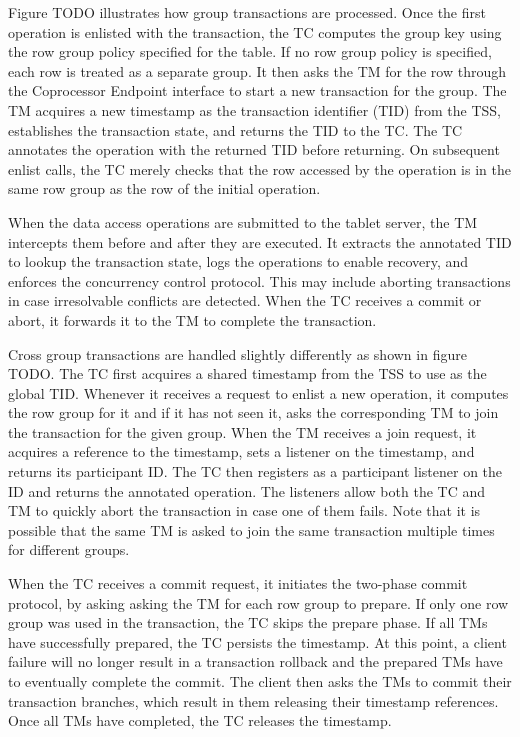 \documentclass[10pt,final,journal]{IEEEtran}
\begin{document}
Figure TODO illustrates how group transactions are processed. Once the first operation is enlisted with the transaction, the TC computes the group key using the row group policy specified for the table. If no row group policy is specified, each row is treated as a separate group. It then asks the TM for the row through the Coprocessor Endpoint interface to start a new transaction for the group. The TM acquires a new timestamp as the transaction identifier (TID) from the TSS, establishes the transaction state, and returns the TID to the TC. The TC annotates the operation with the returned TID before returning. On subsequent enlist calls, the TC merely checks that the row accessed by the operation is in the same row group as the row of the initial operation.

When the data access operations are submitted to the tablet server, the TM intercepts them before and after they are executed. It extracts the annotated TID to lookup the transaction state, logs the operations to enable recovery, and enforces the concurrency control protocol. This may include aborting transactions in case irresolvable conflicts are detected. When the TC receives a commit or abort, it forwards it to the TM to complete the transaction.


Cross group transactions are handled slightly differently as shown in figure TODO. The TC first acquires a shared timestamp from the TSS to use as the global TID. Whenever it receives a request to enlist a new operation, it computes the row group for it and if it has not seen it, asks the corresponding TM to join the transaction for the given group. When the TM receives a join request, it acquires a reference to the timestamp, sets a listener on the timestamp, and returns its participant ID. The TC then registers as a participant listener on the ID and returns the annotated operation. The listeners allow both the TC and TM to quickly abort the transaction in case one of them fails. Note that it is possible that the same TM is asked to join the same transaction multiple times for different groups.

When the TC receives a commit request, it initiates the two-phase commit protocol, by asking asking the TM for each row group to prepare. If only one row group was used in the transaction, the TC skips the prepare phase. If all TMs have successfully prepared, the TC persists the timestamp. At this point, a client failure will no longer result in a transaction rollback and the prepared TMs have to eventually complete the commit. The client then asks the TMs to commit their transaction branches, which result in them releasing their timestamp references. Once all TMs have completed, the TC releases the timestamp.
\end{document}
